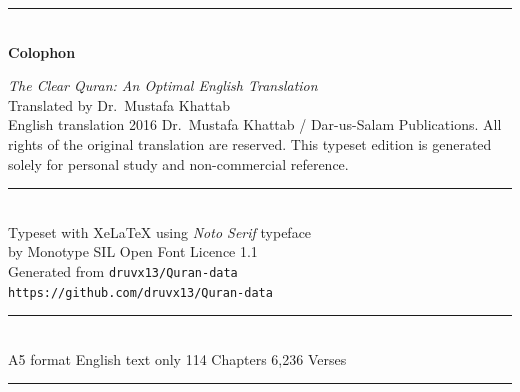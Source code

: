 \documentclass[11pt, twoside, openright]{book}
\begin{document}
\backmatter

\pagestyle{empty}
\vspace*{\fill}

\begin{center}
\textcolor{goldenbrown}{\rule{60mm}{0.5pt}}\\[10mm]

{\large\bfseries\color{deepbrown} Colophon}\\[8mm]

{\small\noindent
\textit{The Clear Quran: An Optimal English Translation}\\
Translated by Dr.~Mustafa Khattab\\[4mm]
\textcolor{muted}{English translation \textcopyright{} 2016 Dr.~Mustafa Khattab /
Dar-us-Salam Publications.
All rights of the original translation are reserved.
This typeset edition is generated solely for personal study and
non-commercial reference.}\\[6mm]
\textcolor{goldenbrown}{\rule{40mm}{0.3pt}}\\[5mm]
Typeset with XeLaTeX using \textit{Noto Serif} typeface\\
by Monotype \textbullet{} SIL Open Font Licence 1.1\\[4mm]
Generated from \texttt{druvx13/Quran-data}\\
\texttt{https://github.com/druvx13/Quran-data}\\[6mm]
\textcolor{goldenbrown}{\rule{40mm}{0.3pt}}\\[5mm]
A5 format \textbullet{} English text only \textbullet{} 114 Chapters \textbullet{} 6,236 Verses
}

\vspace{10mm}
\textcolor{goldenbrown}{\rule{60mm}{0.5pt}}
\end{center}

\vspace*{\fill}
\end{document}
